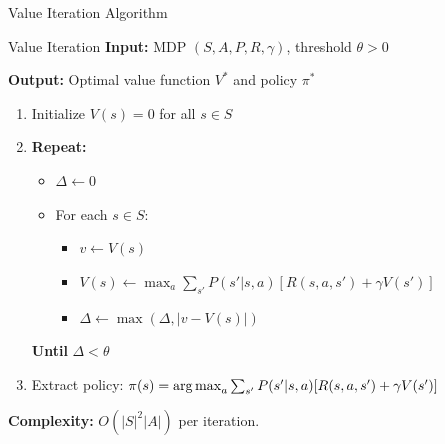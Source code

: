 \documentclass[aspectratio=169]{beamer}
\begin{document}
\begin{frame}[fragile]{Value Iteration Algorithm}
  \begin{examplebox}{Value Iteration}
    \textbf{Input:} MDP $(S, A, P, R, \gamma)$, threshold $\theta > 0$

    \textbf{Output:} Optimal value function $V^*$ and policy $\pi^*$

    \begin{enumerate}
      \item Initialize $V(s) = 0$ for all $s \in S$
      \item \textbf{Repeat:}
      \begin{itemize}
        \item $\Delta \leftarrow 0$
        \item For each $s \in S$:
        \begin{itemize}
          \item $v \leftarrow V(s)$
          \item $V(s) \leftarrow \max_a \sum_{s'} P(s'|s,a)[R(s,a,s') + \gamma V(s')]$
          \item $\Delta \leftarrow \max(\Delta, |v - V(s)|)$
        \end{itemize}
      \end{itemize}
      \textbf{Until} $\Delta < \theta$
      \item Extract policy: $\pi(s) = \operatorname*{arg\,max}_a \sum_{s'} P(s'|s,a)[R(s,a,s') + \gamma V(s')]$
    \end{enumerate}
  \end{examplebox}

  \textbf{Complexity:} $O(|S|^2|A|)$ per iteration.
\end{frame}
\end{document}
